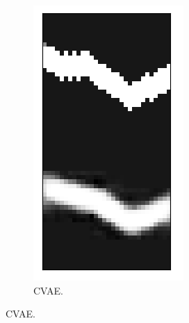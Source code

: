\begin{figure}[t!]
\begin{subfigure}{0.3\columnwidth}
		\includegraphics[width=\linewidth]{img/cvae_tunnel_recon.png}
		\caption{CVAE.}
		\label{subfig:cvae_reconstruction}
	\end{subfigure}
	

\end{figure}

